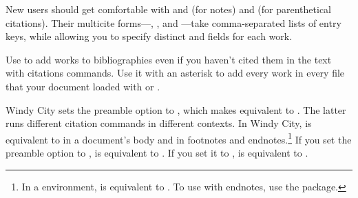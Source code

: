 \documentclass[11pt,letterpaper,oneside]{article}
\begin{document}
\noindent New users should get comfortable with  and
 (for notes) and  (for parenthetical
citations). Their multicite forms---, , and
---take comma-separated lists of entry keys, while
allowing you to specify distinct  and
 fields for each work.

Use  to add works to bibliographies even if you haven't
cited them in the text with citations commands. Use it with an
asterisk to add every work in every  file that your document
loaded with  or .

Windy City sets the  preamble option to ,
which makes  equivalent to . The latter
runs different citation commands in different contexts. In Windy City,
 is equivalent to  in a document's body
and  in footnotes and endnotes.\footnote{In a 
environment,  is equivalent to . To use
 with endnotes, use the  package.} If you
set the  preamble option to , 
is equivalent to . If you set it to ,
 is equivalent to .
\end{document}
